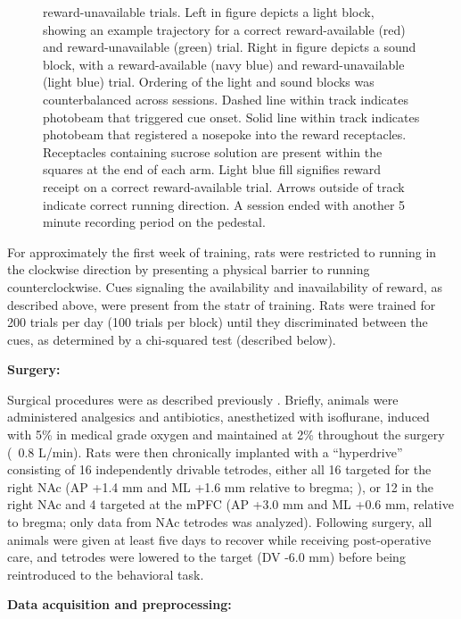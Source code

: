 \documentclass[11pt]{article}
\let\cite=\citep
\let\citeNP=\citealt
\begin{document}
\begin{figure}[h]
{  reward-unavailable trials. Left in figure depicts a light block, showing an
  example trajectory for a correct reward-available (red) and reward-unavailable
  (green) trial. Right in figure depicts a sound block, with a reward-available
  (navy blue) and reward-unavailable (light blue) trial. Ordering of the light
  and sound blocks was counterbalanced across sessions. Dashed line within track
  indicates photobeam that triggered cue onset. Solid line within track
  indicates photobeam that registered a nosepoke into the reward
  receptacles. Receptacles containing sucrose solution are present within the
  squares at the end of each arm. Light blue fill signifies reward receipt on a
  correct reward-available trial. Arrows outside of track indicate correct
  running direction. A session ended with another 5 minute recording period on
  the pedestal.}
\label{fig:task}
\end{figure}

For approximately the first week of training, rats were restricted to
running in the clockwise direction by presenting a physical barrier to
running counterclockwise. Cues signaling the availability and
inavailability of reward, as described above, were present from the
statr of training. Rats were trained for 200 trials per day (100
trials per block) until they discriminated between the cues, as
determined by a chi-squared test (described below).

{\bf Surgery:} 

Surgical procedures were as described previously
\cite{Malhotra2015}. Briefly, animals were administered analgesics and
antibiotics, anesthetized with isoflurane, induced with 5\% in medical
grade oxygen and maintained at 2\% throughout the surgery (~0.8
L/min). Rats were then chronically implanted with a ``hyperdrive''
consisting of 16 independently drivable tetrodes, either all 16
targeted for the right NAc (AP +1.4 mm and ML +1.6 mm relative to
bregma; \citeNP{atlas}), or 12 in the right NAc and 4 targeted at the
mPFC (AP +3.0 mm and ML +0.6 mm, relative to bregma; only data from
NAc tetrodes was analyzed). Following surgery, all animals were given
at least five days to recover while receiving post-operative care, and
tetrodes were lowered to the target (DV -6.0 mm) before being
reintroduced to the behavioral task.

{\bf Data acquisition and preprocessing:}
\end{document}
